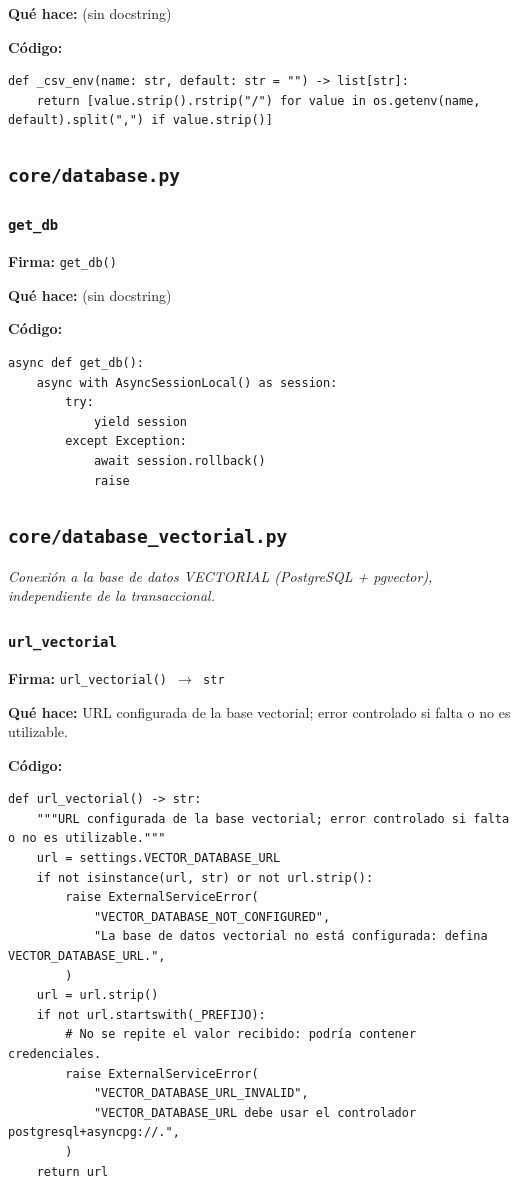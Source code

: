 \documentclass[11pt,a4paper]{article}
\begin{document}
\textbf{Qué hace:} (sin docstring)

\textbf{Código:}
\begin{lstlisting}
def _csv_env(name: str, default: str = "") -> list[str]:
    return [value.strip().rstrip("/") for value in os.getenv(name, default).split(",") if value.strip()]
\end{lstlisting}

\subsection{\texttt{core/database.py}}

\subsubsection*{\texttt{get\_db}}
\textbf{Firma:} \texttt{get\_db()}

\textbf{Qué hace:} (sin docstring)

\textbf{Código:}
\begin{lstlisting}
async def get_db():
    async with AsyncSessionLocal() as session:
        try:
            yield session
        except Exception:
            await session.rollback()
            raise
\end{lstlisting}

\subsection{\texttt{core/database\_vectorial.py}}
\textit{Conexión a la base de datos VECTORIAL (PostgreSQL + pgvector), independiente de la transaccional.}

\subsubsection*{\texttt{url\_vectorial}}
\textbf{Firma:} \texttt{url\_vectorial() $\rightarrow$ str}

\textbf{Qué hace:} URL configurada de la base vectorial; error controlado si falta o no es utilizable.

\textbf{Código:}
\begin{lstlisting}
def url_vectorial() -> str:
    """URL configurada de la base vectorial; error controlado si falta o no es utilizable."""
    url = settings.VECTOR_DATABASE_URL
    if not isinstance(url, str) or not url.strip():
        raise ExternalServiceError(
            "VECTOR_DATABASE_NOT_CONFIGURED",
            "La base de datos vectorial no está configurada: defina VECTOR_DATABASE_URL.",
        )
    url = url.strip()
    if not url.startswith(_PREFIJO):
        # No se repite el valor recibido: podría contener credenciales.
        raise ExternalServiceError(
            "VECTOR_DATABASE_URL_INVALID",
            "VECTOR_DATABASE_URL debe usar el controlador postgresql+asyncpg://.",
        )
    return url
\end{lstlisting}
\end{document}
